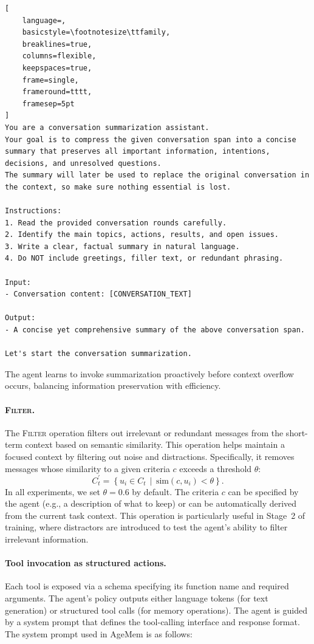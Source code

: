 \begin{lstlisting}[
    language=,
    basicstyle=\footnotesize\ttfamily,
    breaklines=true,
    columns=flexible,
    keepspaces=true,
    frame=single,
    frameround=tttt,
    framesep=5pt
]
You are a conversation summarization assistant. 
Your goal is to compress the given conversation span into a concise summary that preserves all important information, intentions, decisions, and unresolved questions. 
The summary will later be used to replace the original conversation in the context, so make sure nothing essential is lost.

Instructions:
1. Read the provided conversation rounds carefully.
2. Identify the main topics, actions, results, and open issues.
3. Write a clear, factual summary in natural language.
4. Do NOT include greetings, filler text, or redundant phrasing.

Input:
- Conversation content: [CONVERSATION_TEXT]

Output:
- A concise yet comprehensive summary of the above conversation span.

Let's start the conversation summarization.
\end{lstlisting}
The agent learns to invoke summarization proactively before context overflow occurs, balancing information preservation with efficiency.


\paragraph{\textsc{Filter}.}
The \textsc{Filter} operation filters out irrelevant or redundant messages from the short-term context based on semantic similarity. This operation helps maintain a focused context by filtering out noise and distractions. Specifically, it removes messages whose similarity to a given criteria $c$ exceeds a threshold $\theta$:
\begin{equation}
C_t^{\prime}
= \left\{ u_i \in C_t
\, \middle| \,
\text{sim}(c, u_i) < \theta
\right\}.
\end{equation}
In all experiments, we set $\theta = 0.6$ by default. The criteria $c$ can be specified by the agent (e.g., a description of what to keep) or can be automatically derived from the current task context. This operation is particularly useful in Stage~2 of training, where distractors are introduced to test the agent's ability to filter irrelevant information.

\paragraph{Tool invocation as structured actions.}  
Each tool is exposed via a schema specifying its function name and required arguments. The agent's policy outputs either language tokens (for text generation) or structured tool calls (for memory operations). The agent is guided by a system prompt that defines the tool-calling interface and response format. The system prompt used in AgeMem is as follows:

